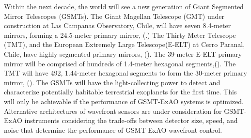 Within the next decade, the world will see a new generation of Giant Segmented Mirror Telescopes (GSMTs). The Giant Magellan Telescope (GMT) under construction at Las Campanas Observatory, Chile, will have seven 8.4-meter mirrors, forming a 24.5-meter primary mirror, (\cite{fanson2020overview}.) The Thirty Meter Telescope (TMT), and the European Extremely Large Telescope(E-ELT) at Cerro Paranal, Chile, have highly segmented primary mirrors, (\cite{chisholm2020thirty}). The 39-meter E-ELT primary mirror will be comprised of hundreds of 1.4-meter hexagonal segments,(\cite{ramsay2020eso}). The TMT will have 492, 1.44-meter hexagonal segments to form the 30-meter primary mirror, (\cite{sanders2013thirty}). The GSMTs will have the light-collecting power to detect and characterize potentially habitable terrestrial exoplanets for the first time. This will only be achievable if the performance of GSMT-ExAO systems is optimized. Alternative architectures of wavefront sensors are under consideration for GSMT-ExAO instruments considering the trade-offs between detector size, speed, and noise that determine the performance of GSMT-ExAO wavefront control. 

